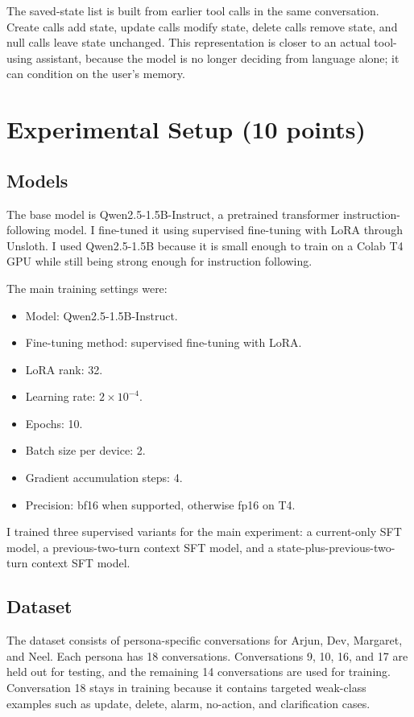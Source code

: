 \documentclass[11pt,a4paper]{article}
\begin{document}
The saved-state list is built from earlier tool calls in the same conversation. Create calls add state, update calls modify state, delete calls remove state, and null calls leave state unchanged. This representation is closer to an actual tool-using assistant, because the model is no longer deciding from language alone; it can condition on the user's memory.


\section{Experimental Setup (10 points)}

\subsection{Models}

The base model is Qwen2.5-1.5B-Instruct, a pretrained transformer instruction-following model. I fine-tuned it using supervised fine-tuning with LoRA through Unsloth. I used Qwen2.5-1.5B because it is small enough to train on a Colab T4 GPU while still being strong enough for instruction following.

The main training settings were:
\begin{itemize}
    \item Model: Qwen2.5-1.5B-Instruct.
    \item Fine-tuning method: supervised fine-tuning with LoRA.
    \item LoRA rank: 32.
    \item Learning rate: $2 \times 10^{-4}$.
    \item Epochs: 10.
    \item Batch size per device: 2.
    \item Gradient accumulation steps: 4.
    \item Precision: bf16 when supported, otherwise fp16 on T4.
\end{itemize}

I trained three supervised variants for the main experiment: a current-only SFT model, a previous-two-turn context SFT model, and a state-plus-previous-two-turn context SFT model.

\subsection{Dataset}

The dataset consists of persona-specific conversations for Arjun, Dev, Margaret, and Neel. Each persona has 18 conversations. Conversations 9, 10, 16, and 17 are held out for testing, and the remaining 14 conversations are used for training. Conversation 18 stays in training because it contains targeted weak-class examples such as update, delete, alarm, no-action, and clarification cases.
\end{document}

